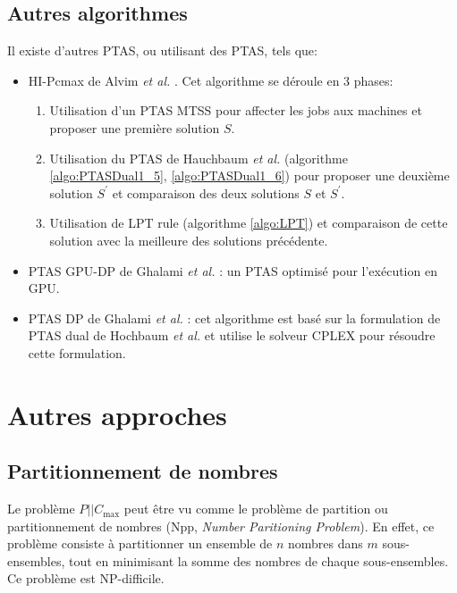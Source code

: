 \documentclass[a4paper,12pt]{report}
\theoremstyle{plain}				%
\theoremstyle{definition}				%
\newcommand\problemGrahamP{$P||C_{\max}$\xspace}
\begin{document}
\subsection{Autres algorithmes}

Il existe d'autres PTAS, ou utilisant des PTAS, tels que:
\begin{itemize}
\item HI-Pcmax de Alvim \emph{et al.} \cite{alvim2004hybrid}.
  Cet algorithme se déroule en 3 phases:
  \begin{enumerate}
  \item Utilisation d'un PTAS MTSS pour affecter les jobs aux machines
    et proposer une première solution $S$.
  \item Utilisation du PTAS de Hauchbaum \emph{et al.}
    (algorithme \ref{algo:PTASDual1_5}, \ref{algo:PTASDual1_6}) pour
    proposer une deuxième solution $S^\prime$
    et comparaison des deux solutions $S$ et $S^\prime$.
  \item Utilisation de LPT rule (algorithme \ref{algo:LPT}) et
    comparaison de cette solution avec la meilleure des solutions
    précédente.
  \end{enumerate}

\item PTAS GPU-DP de Ghalami \emph{et al.} \cite{li2018gpu}:
  un PTAS optimisé pour l'exécution en GPU.

\item PTAS DP de Ghalami \emph{et al.}
  \cite{ghalami2019scheduling}: cet algorithme est basé sur la
  formulation de PTAS dual de Hochbaum \emph{et al.}
  et utilise le solveur CPLEX pour résoudre cette formulation.
\end{itemize}


\section{Autres approches} \label{sec:autresApproches}

\subsection{Partitionnement de nombres}
\label{ssec:autresApprochesPartitionnement}

Le problème \problemGrahamP peut être vu comme le problème de
partition ou partitionnement de nombres (Npp, \emph{Number Paritioning
Problem}).
En effet, ce problème consiste à partitionner un ensemble de $n$ nombres
dans $m$ sous-ensembles, tout en minimisant la somme des nombres de
chaque sous-ensembles.
Ce problème est NP-difficile.
\end{document}
